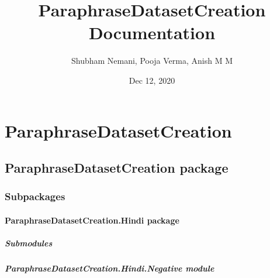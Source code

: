 \documentclass[letterpaper,10pt,english]{sphinxmanual}
\title{ParaphraseDatasetCreation Documentation}
\date{Dec 12, 2020}
\author{Shubham Nemani, Pooja Verma, Anish M M}
\begin{document}
\pagestyle{empty}
\sphinxmaketitle
\pagestyle{plain}
\sphinxtableofcontents
\pagestyle{normal}
\label{\detokenize{index::doc}}



\chapter{ParaphraseDatasetCreation}
\label{\detokenize{modules:paraphrasedatasetcreation}}\label{\detokenize{modules::doc}}

\section{ParaphraseDatasetCreation package}
\label{\detokenize{ParaphraseDatasetCreation:paraphrasedatasetcreation-package}}\label{\detokenize{ParaphraseDatasetCreation::doc}}

\subsection{Subpackages}
\label{\detokenize{ParaphraseDatasetCreation:subpackages}}

\subsubsection{ParaphraseDatasetCreation.Hindi package}
\label{\detokenize{ParaphraseDatasetCreation.Hindi:paraphrasedatasetcreation-hindi-package}}\label{\detokenize{ParaphraseDatasetCreation.Hindi::doc}}

\paragraph{Submodules}
\label{\detokenize{ParaphraseDatasetCreation.Hindi:submodules}}

\paragraph{ParaphraseDatasetCreation.Hindi.Negative module}
\label{\detokenize{ParaphraseDatasetCreation.Hindi:module-ParaphraseDatasetCreation.Hindi.Negative}}\label{\detokenize{ParaphraseDatasetCreation.Hindi:paraphrasedatasetcreation-hindi-negative-module}}
\end{document}
